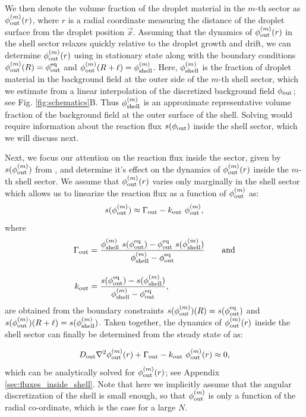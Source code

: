 We then denote the volume fraction of the droplet material in the $m$-th sector as $\phi_\mathrm{out}^{(m)}(r)$, where $r$ is a radial coordinate measuring the distance of the droplet surface from the droplet position $\vec{x}$.
Assuming that the dynamics of $\phi_\mathrm{out}^{(m)}(r)$ in the shell sector relaxes quickly relative to the droplet growth and drift, we can determine $\phi_\mathrm{out}^{(m)}(r)$ using  in stationary state along with the boundary conditions $\phi_\mathrm{out}^{(m)}(R)=\phi^\mathrm{eq}_\mathrm{out}$ and $\phi_\mathrm{out}^{(m)}(R + \ell)= \phi_\mathrm{shell}^{(m)}$.
Here, $\phi_\mathrm{shell}^{(m)}$ is the fraction of droplet material in the background field at the outer side of the $m$-th shell sector, which we estimate from a linear interpolation of the discretized background field $\phi_\mathrm{out}$; see Fig. \ref{fig:schematics}B.
Thus $\phi_\mathrm{shell}^{(m)}$ is an approximate representative volume fraction of the background field at the outer surface of the shell. 
Solving  would require information about the reaction flux $s(\phi_\mathrm{out})$ inside the shell sector, which we will discuss next.

Next, we focus our attention on the reaction flux inside the sector, given by $s(\phi_\mathrm{out}^{(m)})$ from , and determine it's effect on the dynamics of $\phi_\mathrm{out}^{(m)}(r)$ inside the $m$-th shell sector.
We assume that $\phi_\mathrm{out}^{(m)}(r)$ varies only marginally in the shell sector which allows us to linearize the reaction flux as a function of $\phi_\mathrm{out}^{(m)}$ as:
\begin{equation*}
    s(\phi_\mathrm{out}^{(m)}) \approx \Gamma_\mathrm{out} - k_\mathrm{out}~\phi_\mathrm{out}^{(m)},
\end{equation*}
where
\begin{subequations} 
\label{eqn:GammaOut_KOut}
\begin{align}
    \Gamma_\mathrm{out} &= \frac{\phi_\mathrm{shell}^{(m)}~s(\phi^\mathrm{eq}_\mathrm{out}) - \phi^\mathrm{eq}_\mathrm{out}~s(\phi_\mathrm{shell}^{(m)})}{\phi_\mathrm{shell}^{(m)} - \phi^\mathrm{eq}_\mathrm{out}} 
    \qquad \text{and}
    \\[10pt]
    k_\mathrm{out} &= \frac{s(\phi^\mathrm{eq}_\mathrm{out}) - s(\phi_\mathrm{shell}^{(m)})}{ \phi_\mathrm{shell}^{(m)} - \phi^\mathrm{eq}_\mathrm{out}},
\end{align}
\end{subequations}
are obtained from the boundary constraints $s(\phi_\mathrm{out}^{(m)})(R) = s(\phi^\mathrm{eq}_\mathrm{out})$ and $s(\phi_\mathrm{out}^{(m)})(R + \ell) = s(\phi_\mathrm{shell}^{(m)})$.
Taken together, the dynamics of $\phi_\mathrm{out}^{(m)}(r)$ inside the shell sector can finally be determined from the steady state of  as:

\begin{equation}
\label{eqn:phi_out_in_shell}
     D_\mathrm{out}  \nabla ^2 \phi_\mathrm{out}^{(m)}(r) + \Gamma_\mathrm{out} - k_\mathrm{out}~\phi_\mathrm{out}^{(m)}(r) \approx 0,
\end{equation}
which can be analytically solved for $\phi_\mathrm{out}^{(m)}(r)$; see Appendix \ref{sec:fluxes_inside_shell}.
Note that here we implicitly assume that the angular discretization of the shell is small enough, so that $\phi_\mathrm{out}^{(m)}$ is only a function of the radial co-ordinate, which is the case for a large $N$.

